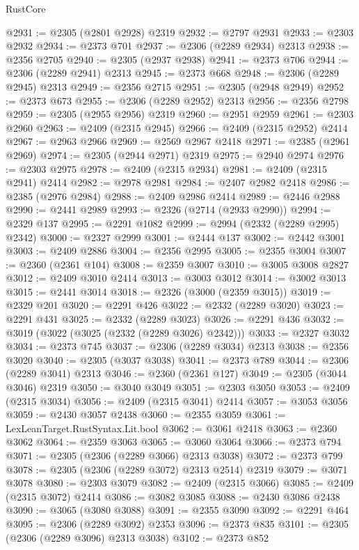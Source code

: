 \begin{lexlean}{RustCore}
\begin{coremodule}
@2931 := @2305 (@2801 @2928) @2319
@2932 := @2797 @2931
@2933 := @2303 @2932
@2934 := @2373 @701
@2937 := @2306 (@2289 @2934) @2313
@2938 := @2356 @2705
@2940 := @2305 (@2937 @2938)
@2941 := @2373 @706
@2944 := @2306 (@2289 @2941) @2313
@2945 := @2373 @668
@2948 := @2306 (@2289 @2945) @2313
@2949 := @2356 @2715
@2951 := @2305 (@2948 @2949)
@2952 := @2373 @673
@2955 := @2306 (@2289 @2952) @2313
@2956 := @2356 @2798
@2959 := @2305 (@2955 @2956) @2319
@2960 := @2951 @2959
@2961 := @2303 @2960
@2963 := @2409 (@2315 @2945)
@2966 := @2409 (@2315 @2952) @2414
@2967 := @2963 @2966
@2969 := @2569 @2967 @2418
@2971 := @2385 (@2961 @2969)
@2974 := @2305 (@2944 @2971) @2319
@2975 := @2940 @2974
@2976 := @2303 @2975
@2978 := @2409 (@2315 @2934)
@2981 := @2409 (@2315 @2941) @2414
@2982 := @2978 @2981
@2984 := @2407 @2982 @2418
@2986 := @2385 (@2976 @2984)
@2988 := @2409 @2986 @2414
@2989 := @2446 @2988
@2990 := @2441 @2989
@2993 := @2326 (@2714 (@2933 @2990))
@2994 := @2329 @137
@2995 := @2291 @1082
@2999 := @2994 (@2332 (@2289 @2995) @2342)
@3000 := @2327 @2999
@3001 := @2444 @137
@3002 := @2442 @3001
@3003 := @2409 @2886
@3004 := @2356 @2995
@3005 := @2355 @3004
@3007 := @2360 (@2361 @104)
@3008 := @2359 @3007
@3010 := @3005 @3008 @2827
@3012 := @2409 @3010 @2414
@3013 := @3003 @3012
@3014 := @3002 @3013
@3015 := @2441 @3014
@3018 := @2326 (@3000 (@2359 @3015))
@3019 := @2329 @201
@3020 := @2291 @426
@3022 := @2332 (@2289 @3020)
@3023 := @2291 @431
@3025 := @2332 (@2289 @3023)
@3026 := @2291 @436
@3032 := @3019 (@3022 (@3025 (@2332 (@2289 @3026) @2342)))
@3033 := @2327 @3032
@3034 := @2373 @745
@3037 := @2306 (@2289 @3034) @2313
@3038 := @2356 @3020
@3040 := @2305 (@3037 @3038)
@3041 := @2373 @789
@3044 := @2306 (@2289 @3041) @2313
@3046 := @2360 (@2361 @127)
@3049 := @2305 (@3044 @3046) @2319
@3050 := @3040 @3049
@3051 := @2303 @3050
@3053 := @2409 (@2315 @3034)
@3056 := @2409 (@2315 @3041) @2414
@3057 := @3053 @3056
@3059 := @2430 @3057 @2438
@3060 := @2355 @3059
@3061 := LexLeanTarget.RustSyntax.Lit.bool
@3062 := @3061 @2418
@3063 := @2360 @3062
@3064 := @2359 @3063
@3065 := @3060 @3064
@3066 := @2373 @794
@3071 := @2305 (@2306 (@2289 @3066) @2313 @3038)
@3072 := @2373 @799
@3078 := @2305 (@2306 (@2289 @3072) @2313 @2514) @2319
@3079 := @3071 @3078
@3080 := @2303 @3079
@3082 := @2409 (@2315 @3066)
@3085 := @2409 (@2315 @3072) @2414
@3086 := @3082 @3085
@3088 := @2430 @3086 @2438
@3090 := @3065 (@3080 @3088)
@3091 := @2355 @3090
@3092 := @2291 @464
@3095 := @2306 (@2289 @3092) @2353
@3096 := @2373 @835
@3101 := @2305 (@2306 (@2289 @3096) @2313 @3038)
@3102 := @2373 @852

\end{coremodule}
\end{lexlean}
